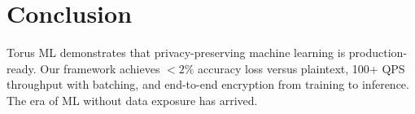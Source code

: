 \documentclass{../shared/luxfhe}
\begin{document}
\section{Conclusion}

Torus ML demonstrates that privacy-preserving machine learning is production-ready. Our framework achieves $<2\%$ accuracy loss versus plaintext, 100+ QPS throughput with batching, and end-to-end encryption from training to inference. The era of ML without data exposure has arrived.



\end{document}
